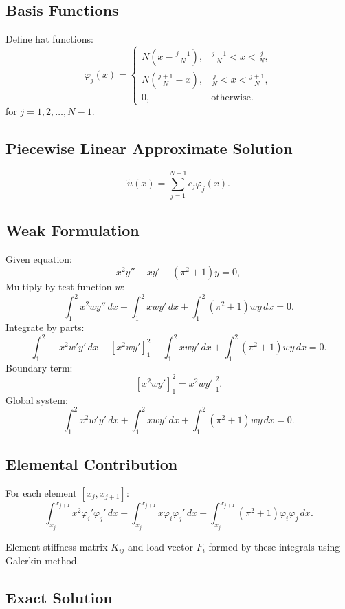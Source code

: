 \documentclass{article}
\begin{document}
\subsection*{Basis Functions}

Define hat functions:
\[
\varphi_j (x) =
\begin{cases}
N \left( x - \frac{j-1}{N} \right), & \frac{j-1}{N} < x < \frac{j}{N}, \\
N \left( \frac{j+1}{N} - x \right), & \frac{j}{N} < x < \frac{j+1}{N}, \\
0, & \text{otherwise}.
\end{cases}
\]
for $j = 1, 2, \dots, N-1$.

\subsection*{Piecewise Linear Approximate Solution}

\[
\tilde{u}(x) = \sum_{j=1}^{N-1} c_j \varphi_j(x).
\]

\subsection*{Weak Formulation}

Given equation:
\[
x^2 y'' - x y' + (\pi^2 + 1)y = 0,
\]
Multiply by test function $w$:
\[
\int_1^2 x^2 w y'' \, dx - \int_1^2 x w y' \, dx + \int_1^2 (\pi^2 + 1) w y \, dx = 0.
\]
Integrate by parts:
\[
\int_1^2 -x^2 w' y' \, dx + \left[ x^2 w y' \right]_1^2 - \int_1^2 x w y' \, dx + \int_1^2 (\pi^2 + 1) w y \, dx = 0.
\]
Boundary term:
\[
\left[ x^2 w y' \right]_1^2 = x^2 w y' \bigg|_1^2.
\]
Global system:
\[
\int_1^2 x^2 w' y' \, dx + \int_1^2 x w y' \, dx + \int_1^2 (\pi^2 + 1) w y \, dx = 0.
\]

\subsection*{Elemental Contribution}

For each element $[x_j, x_{j+1}]$:
\[
\int_{x_j}^{x_{j+1}} x^2 \varphi_i' \varphi_j' \, dx + \int_{x_j}^{x_{j+1}} x \varphi_i \varphi_j' \, dx + \int_{x_j}^{x_{j+1}} (\pi^2 + 1) \varphi_i \varphi_j \, dx.
\]

Element stiffness matrix $K_{ij}$ and load vector $F_i$ formed by these integrals using Galerkin method.

\subsection*{Exact Solution}
\end{document}
